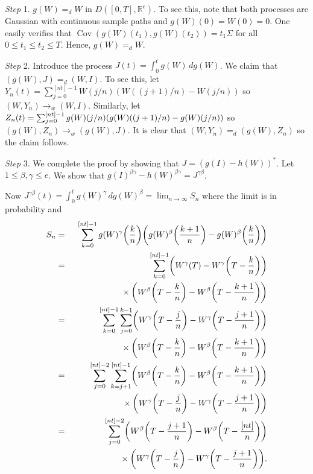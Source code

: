 \documentclass[aop,MSNbibl,seceqn,dvips]{arximspdf}
\newcommand{\R}{\mathbb{R}}
\newcommand{\Cov}{\operatorname{Cov}}
\begin{document}
\begin{pf}
\textit{Step} 1. $g(W)=_d W$
in $D([0,T],\R^e)$.
To see this, note that both processes are
Gaussian with continuous sample
paths and $g(W)(0)=W(0)=0$. One easily verifies that $\Cov
(g(W)(t_1),g(W)(t_2))=t_1\Sigma$ for all $0\le t_1\le t_2\le T$.
Hence, $g(W)=_d W$.

\textit{Step} 2. Introduce the process $J(t)=\int_0^t g(W) \,dg(W)$.
We claim that\break $(g(W), J)=_d (W,I)$. To see this, let
$Y_n(t)=\sum_{j=0}^{[nt]-1}W(j/n)(W((j+1)/n)-W(j/n))$ so
$(W,Y_n)\to_w (W,I)$.
Similarly,\vspace*{1pt} let
$Z_n(t)=\sum_{j=0}^{[nt]-1}g(W)(j/n)\*(g(W)((j+1)/n)-g(W)(j/n))$ so
$(g(W),Z_n)\to_w (g(W),J)$.
It is clear that $(W,Y_n)=_d(g(W),Z_n)$ so the claim follows.

\textit{Step} 3. We complete the proof by showing that
$J=(g(I)-h(W))^*$. Let $1\le\beta,\gamma\le e$. We show that
$g(I)^{\beta\gamma}-h(W)^{\beta\gamma}=J^{\gamma\beta}$.

Now
$J^{\gamma\beta}(t) = \int_0^t g(W)^\gamma \,dg(W)^\beta
=\lim_{n\to\infty} S_n$ where the limit is in probability and
%
\begin{eqnarray*}
S_n & =& \sum_{k=0}^{[nt]-1}g(W)^\gamma
\biggl({\frac{k}{n}}\biggr) \biggl(g(W)^\beta\biggl({
\frac{k+1}{n}}\biggr)- g(W)^\beta\biggl({\frac{k}{n}}\biggr)
\biggr)
\\
& =&\sum_{k=0}^{[nt]-1} \biggl(W^\gamma(T)-W^\gamma
\biggl(T-{\frac
{k}{n}}\biggr) \biggr)\\
&&\hspace*{28pt}{}\times \biggl(W^\beta\biggl(T-{
\frac{k}{n}}\biggr)- W^\beta\biggl(T-{\frac
{k+1}{n}}\biggr)
\biggr)
\\
& =&\sum_{k=0}^{[nt]-1}\sum
_{j=0}^{k-1} \biggl(W^\gamma\biggl(T-{
\frac
{j}{n}}\biggr)-W^\gamma\biggl(T-{\frac{j+1}{n}}\biggr)
\biggr)\\
&&\hspace*{46pt}{}\times \biggl(W^\beta\biggl(T-{\frac{k}{n}}\biggr)-
W^\beta\biggl(T-{\frac
{k+1}{n}}\biggr) \biggr)
\\
& =&\sum_{j=0}^{[nt]-2}\sum
_{k=j+1}^{[nt]-1} \biggl(W^\beta\biggl(T-{
\frac{k}{n}}\biggr)- W^\beta\biggl(T-{\frac
{k+1}{n}}\biggr)
\biggr) \\
&&\hspace*{58pt}{}\times \biggl(W^\gamma\biggl(T-{\frac{j}{n}}\biggr)-W^\gamma
\biggl(T-{\frac
{j+1}{n}}\biggr) \biggr)
\\
& =&\sum_{j=0}^{[nt]-2} \biggl(W^\beta
\biggl(T-{\frac{j+1}{n}}\biggr)- W^\beta\biggl(T-{
\frac
{[nt]}{n}}\biggr) \biggr) \\
&&\hspace*{29pt}{}\times \biggl(W^\gamma\biggl(T-{
\frac{j}{n}}\biggr)-W^\gamma\biggl(T-{\frac
{j+1}{n}}\biggr)
\biggr).
\end{eqnarray*}


\end{pf}
\end{document}
